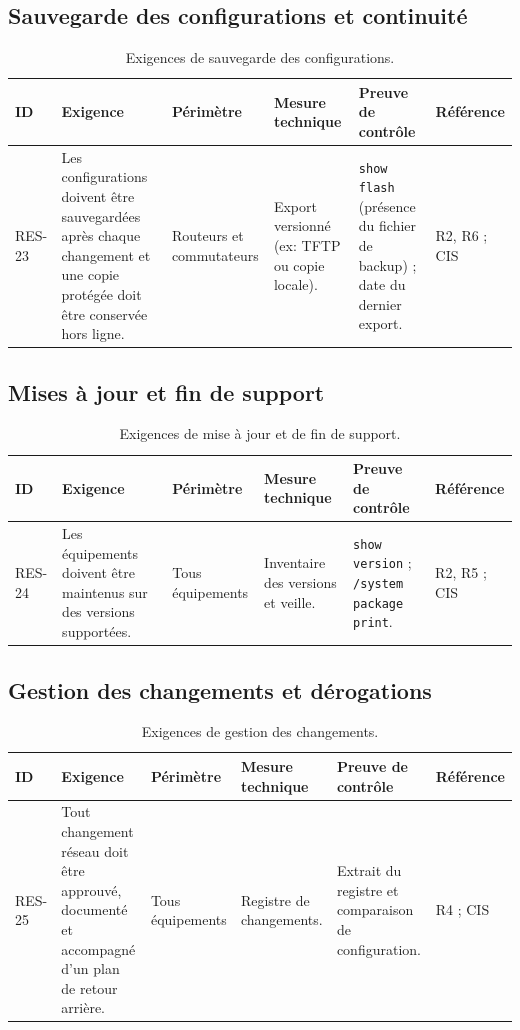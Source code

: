 \documentclass[11pt,a4paper]{article}
\begin{document}
	\subsection{Sauvegarde des configurations et continuité}
	
	\scriptsize
	\begin{longtable}{p{0.7cm} p{3.95cm} p{1.95cm} p{3.2cm} p{3.0cm} p{1.8cm}}
		\caption{Exigences de sauvegarde des configurations.}\\
		\hline
		\textbf{ID} & \textbf{Exigence} & \textbf{Périmètre} & \textbf{Mesure technique} & \textbf{Preuve de contrôle} & \textbf{Référence}\\
		\hline
		\endhead
		RES-23 & Les configurations doivent être sauvegardées après chaque changement et une copie protégée doit être conservée hors ligne. & Routeurs et commutateurs & Export versionné (ex: TFTP ou copie locale). & \texttt{show flash} (présence du fichier de backup) ; date du dernier export. & R2, R6 ; CIS\\
		\hline
	\end{longtable}
	\normalsize
	
	\subsection{Mises à jour et fin de support}
	
	\scriptsize
	\begin{longtable}{p{0.7cm} p{3.95cm} p{1.95cm} p{3.2cm} p{3.0cm} p{1.8cm}}
		\caption{Exigences de mise à jour et de fin de support.}\\
		\hline
		\textbf{ID} & \textbf{Exigence} & \textbf{Périmètre} & \textbf{Mesure technique} & \textbf{Preuve de contrôle} & \textbf{Référence}\\
		\hline
		\endhead
		RES-24 & Les équipements doivent être maintenus sur des versions supportées. & Tous équipements & Inventaire des versions et veille. & \texttt{show version} ; \texttt{/system package print}. & R2, R5 ; CIS\\
		\hline
	\end{longtable}
	\normalsize
	
	\subsection{Gestion des changements et dérogations}
	
	\scriptsize
	\begin{longtable}{p{0.7cm} p{3.95cm} p{1.95cm} p{3.2cm} p{3.0cm} p{1.8cm}}
		\caption{Exigences de gestion des changements.}\\
		\hline
		\textbf{ID} & \textbf{Exigence} & \textbf{Périmètre} & \textbf{Mesure technique} & \textbf{Preuve de contrôle} & \textbf{Référence}\\
		\hline
		\endhead
		RES-25 & Tout changement réseau doit être approuvé, documenté et accompagné d'un plan de retour arrière. & Tous équipements & Registre de changements. & Extrait du registre et comparaison de configuration. & R4 ; CIS\\
		\hline
	\end{longtable}
	\normalsize
	
\end{document}
